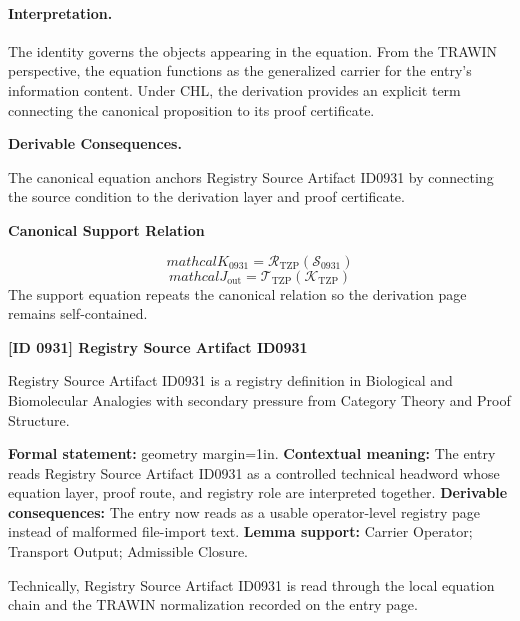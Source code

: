 \paragraph{Interpretation.}
The identity governs the objects appearing in the equation. From the TRAWIN perspective, the equation functions as the generalized carrier for the entry’s information content. Under CHL, the derivation provides an explicit term connecting the canonical proposition to its proof certificate.

\par\vspace{0.35em}
\noindent\textbf{Derivable Consequences.}\quad
\begingroup
\footnotesize
\raggedright
The canonical equation anchors Registry Source Artifact ID0931 by connecting the source condition to the derivation layer and proof certificate.
\par\endgroup

\noindent\textbf{Canonical Support Relation}\par
\[
mathcal{K}_{0931}=\mathcal{R}_{\mathrm{TZP}}\!\left(\mathcal{S}_{0931}\right)
\]
\[
mathcal{J}_{\mathrm{out}} = \mathcal{T}_{\mathrm{TZP}}\!\left(\mathcal{K}_{\mathrm{TZP}}\right)
\]
\noindent The support equation repeats the canonical relation so the derivation page remains self-contained.\par

\clearpage
\noindent\textbf{[ID 0931] Registry Source Artifact ID0931}\par
\vspace{0.35em}
\begingroup\small
{}
Registry Source Artifact ID0931 is a registry definition in Biological and Biomolecular Analogies with secondary pressure from Category Theory and Proof Structure.

\begingroup\footnotesize\setlength{\emergencystretch}{3em}\sloppy
\textbf{Formal statement:} geometry margin=1in. \textbf{Contextual meaning:} The entry reads Registry Source Artifact ID0931 as a controlled technical headword whose equation layer, proof route, and registry role are interpreted together. \textbf{Derivable consequences:} The entry now reads as a usable operator-level registry page instead of malformed file-import text. \textbf{Lemma support:} Carrier Operator; Transport Output; Admissible Closure.\par
\endgroup

Technically, Registry Source Artifact ID0931 is read through the local equation chain and the TRAWIN normalization recorded on the entry page.


